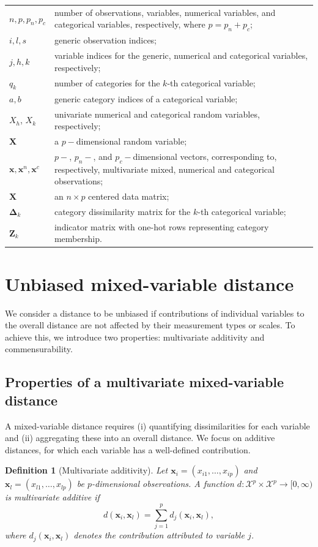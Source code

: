 \documentclass[12pt]{article}
\newtheorem{definition}{Definition}
\begin{document}
\renewcommand{\arraystretch}{0.8}
\begin{tabular}[H]{p{1.5cm}p{13cm}}
$n, p, p_n, p_c$ & number of observations, variables, numerical variables, and categorical variables, respectively, where $p=p_n+p_c$;\\
$i,l,s$ & generic observation indices;\\
$j, h, k$ & variable indices for the generic, numerical and categorical variables, respectively;\\
$q_k$ & number of categories for the $k$-th categorical variable;\\
$a,b$ & generic category indices of a categorical variable;\\
$X_h$, $X_k$ & univariate numerical and categorical random variables, respectively;\\
$\bm{X}$ & a $p-$dimensional random variable;\\
$\mathbf{x}, \mathbf{x}^n, \mathbf{x}^c$ & $p-$, $p_n-$, and $p_c-$dimensional vectors, corresponding to, respectively, multivariate mixed, numerical and categorical observations;\\
$\mathbf{X}$ & an $n \times p$ centered data matrix;\\
$\bm{\Delta}_k$ & category dissimilarity matrix for the $k$-th categorical variable;\\
$\mathbf{Z}_k$ & indicator matrix with one-hot rows representing category membership.
\end{tabular}

\section{Unbiased mixed-variable distance}\label{framework}
We consider a distance to be unbiased if contributions of individual variables to the overall distance are not affected by their measurement types or scales. To achieve this, we introduce two properties: multivariate additivity and commensurability.

\subsection{Properties of a multivariate mixed-variable distance} \label{properties}
A mixed-variable distance requires (i) quantifying dissimilarities for each variable and (ii) aggregating these into an overall distance. We focus on additive distances, for which each variable has a well-defined contribution.

\begin{definition}[Multivariate additivity] \label{DefMA}
Let $\mathbf{x}_i = (x_{i1}, \dots,x_{ip})$ and $\mathbf{x}_l = (x_{l1}, \dots,x_{lp})$ be $p$-dimensional observations.
A function $d : \mathcal{X}^p \times \mathcal{X}^p \to [0,\infty)$ is \emph{multivariate additive} if
\begin{equation*}
    d(\mathbf{x}_i,\mathbf{x}_l)
    = \sum_{j=1}^p d_j(\mathbf{x}_i,\mathbf{x}_l),
\end{equation*}
where $d_j(\mathbf{x}_i,\mathbf{x}_l)$ denotes the contribution attributed to variable $j$.
\end{definition}
\end{document}
